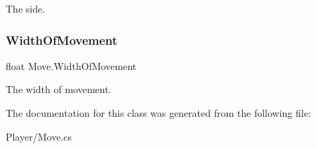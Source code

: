 The side. 

\mbox{\label{class_move_a564c70756027d119d684db3edfede659}} 
\subsubsection{\texorpdfstring{Width\+Of\+Movement}{WidthOfMovement}}
{\footnotesize\ttfamily float Move.\+Width\+Of\+Movement}



The width of movement. 



The documentation for this class was generated from the following file\+:\begin{DoxyCompactItemize}
\item 
Player/Move.\+cs\end{DoxyCompactItemize}
